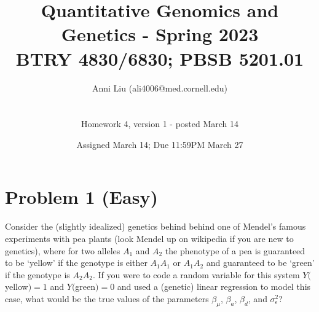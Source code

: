 \documentclass[letterpaper, 11pt]{article}
\title{Quantitative Genomics and Genetics - Spring 2023 \\
BTRY 4830/6830; PBSB 5201.01}
\author{Anni Liu (ali4006@med.cornell.edu) \\ \\ \\ Homework 4, version 1 - posted March 14  }
\date{Assigned March 14; Due 11:59PM March 27}                                           %
\begin{document}
\vspace{-20in}

\maketitle
\section*{Problem 1 (Easy)}

Consider the (slightly idealized) genetics behind behind one of Mendel's famous experiments with pea plants (look Mendel up on wikipedia if you are new to genetics), where for two alleles $A_1$ and $A_2$ the phenotype of a pea is guaranteed to be `yellow' if the genotype is either $A_1A_1$ or $A_1A_2$ and guaranteed to be `green' if the genotype is $A_2A_2$.  If you were to code a random variable for this system $Y($yellow$) = 1$ and $Y($green$) = 0$ and used a (genetic) linear regression to model this case, what would be the true values of the parameters $\beta_\mu$, $\beta_a$, $\beta_d$, and $\sigma^2_\epsilon$? \\
\end{document}
